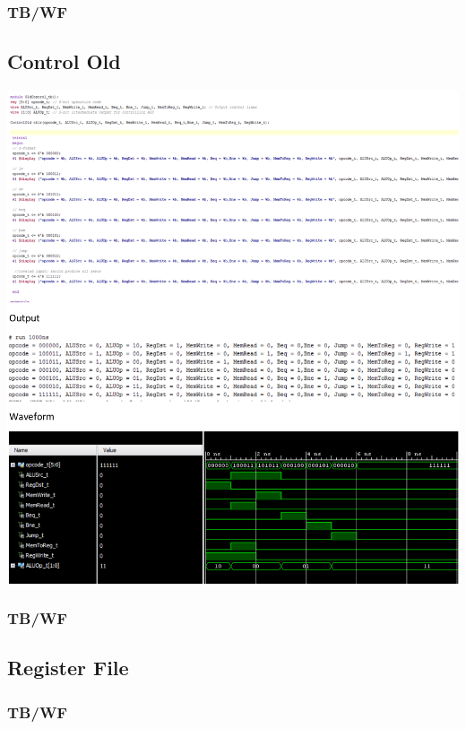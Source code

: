 \documentclass{llncs}
\begin{document}
\subsubsection{TB/WF}



\subsection{Control Old} %
\label{co:1}
\includegraphics[scale=.3]{images/l.png}
\subsubsection{TB/WF}
\label{co:1}

\subsection{Register File}
\label{alu:1}
\begin{addmargin}[-5em]{-6em}

\end{addmargin}
\subsubsection{TB/WF}

\end{document}
